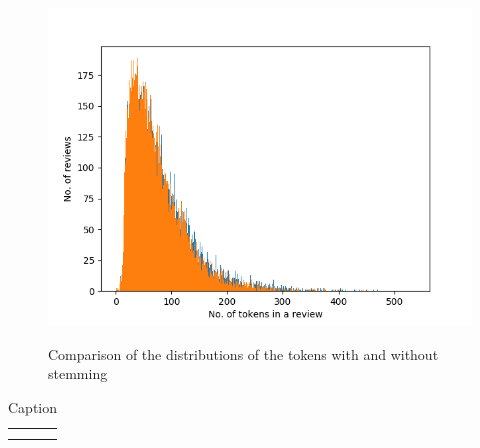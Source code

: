 \begin{figure}
    \caption{Comparison of the distributions of the tokens with and without stemming}
    \includegraphics[scale=0.5]{figures/token_stem_review.png}
    \label{fig:stem_and_token_review}
\end{figure}

\begin{table}[]
    \centering
    \begin{tabular}{c|c}
         &  \\
         & 
    \end{tabular}
    \caption{Caption}
    \label{tab:my_label}
\end{table}